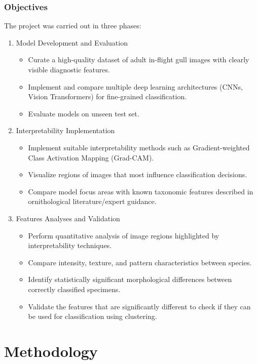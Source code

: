 \documentclass[a4paper,12pt]{report}
\begin{document}
\subsection{Objectives}
The project was carried out in three phases:
\begin{enumerate}
    \item Model Development and Evaluation
        \begin{itemize}
            \item Curate a high-quality dataset of adult in-flight gull images with clearly visible diagnostic features.
            \item Implement and compare multiple deep learning architectures (CNNs, Vision Transformers) for fine-grained classification.
            \item Evaluate models on unseen test set.
        \end{itemize}
    \item Interpretability Implementation
        \begin{itemize}
            \item Implement suitable interpretability methods such as Gradient-weighted Class Activation Mapping (Grad-CAM).
            \item Visualize regions of images that most influence classification decisions.
            \item Compare model focus areas with known taxonomic features described in ornithological literature/expert guidance.
        \end{itemize}
    \item Features Analyses and Validation
        \begin{itemize}
            \item Perform quantitative analysis of image regions highlighted by interpretability techniques.
            \item Compare intensity, texture, and pattern characteristics between species.
            \item Identify statistically significant morphological differences between correctly classified specimens.
            \item Validate the features that are significantly different to check if they can be used for classification using clustering.
        \end{itemize}
\end{enumerate}

\newpage
\chapter{Methodology}
\end{document}
